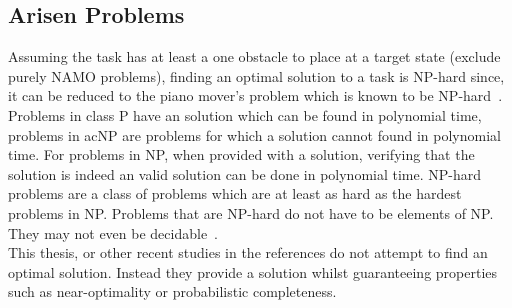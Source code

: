 \subsection{Arisen Problems}
\label{subsection:problems_with_task_planning}
Assuming the task has at least a one obstacle to place at a target state (exclude purely \ac{NAMO} problems), finding an optimal solution to a task is \ac{NP-hard} since, it can be reduced to the piano mover's problem which is known to be \ac{NP-hard}~\cite{reif_motion_1985}.\\Problems in class P have an solution which can be found in polynomial time, problems in ac{NP} are problems for which a solution cannot found in polynomial time. For problems in \ac{NP}, when provided with a solution, verifying that the solution is indeed an valid solution can be done in polynomial time. \ac{NP-hard} problems are a class of problems which are at least as hard as the hardest problems in \ac{NP}. Problems that are \ac{NP-hard} do not have to be elements of NP. They may not even be decidable~\cite{pokharel_computational_2020}.\\This thesis, or other recent studies in the references do not attempt to find an optimal solution. Instead they provide a solution whilst guaranteeing properties such as near-optimality or probabilistic completeness.\bs 

